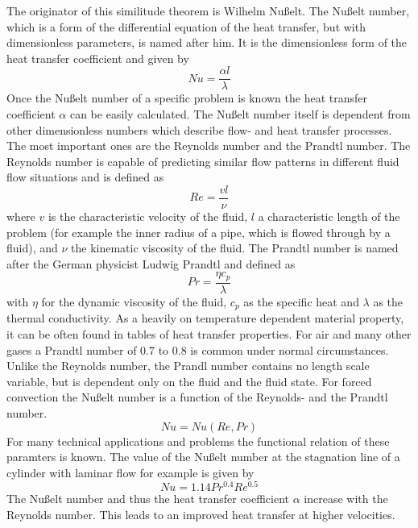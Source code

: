 The originator of this similitude theorem is Wilhelm Nußelt. The Nußelt number, which is a form of the differential equation of the heat transfer, but with dimensionless parameters, is named after him. It is the dimensionless form of the heat transfer coefficient and given by
\begin{equation}
\label{eq:Nu1}
Nu = \frac{\alpha l}{\lambda}
\end{equation}
Once the Nußelt number of a specific problem is known the heat transfer coefficient $\alpha$ can be easily calculated. The Nußelt number itself is dependent from other dimensionless numbers which describe flow- and heat transfer processes.
The most important ones are the Reynolds number and the Prandtl number. The Reynolds number is capable of predicting similar flow patterns in different fluid flow situations and is defined as 
\begin{equation}
Re = \frac{v l}{\nu}
\end{equation}
where $v$ is the characteristic velocity of the fluid, $l$ a characteristic length of the problem (for example the inner radius of a pipe, which is flowed through by a fluid), and $\nu$ the kinematic viscosity of the fluid.
The Prandtl number is named after the German physicist Ludwig Prandtl and defined as
\begin{equation}
Pr = \frac{\eta c_p}{\lambda}
\end{equation}
with $\eta$ for the dynamic viscosity of the fluid, $c_p$ as the specific heat and $\lambda$ as the thermal conductivity. As a heavily on temperature dependent material property, it can be often found in tables of heat transfer properties. For air and many other gases a Prandtl number of 0.7 to 0.8 is common under normal circumstances. Unlike the Reynolds number, the Prandl number contains no length scale variable, but is dependent only on the fluid and the fluid state.
For forced convection the Nußelt number is a function of the Reynolds- and the Prandtl number.
\begin{equation}
Nu = Nu( Re, Pr )
\end{equation}
For many technical applications and problems the functional relation of these paramters is known. The value of the Nußelt number at the stagnation line of a cylinder with laminar flow for example is given by
\begin{equation}
\label{eq:Nu2}
Nu = 1.14Pr^{0.4} Re^{0.5} 
\end{equation}
The Nußelt number and thus the heat transfer coefficient $\alpha$ increase with the Reynolds number. This leads to an improved heat transfer at higher velocities. 
